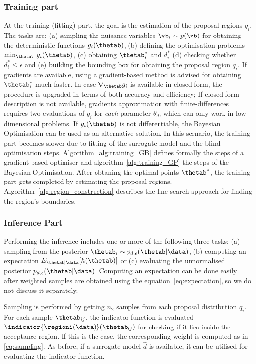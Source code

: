 \subsubsection*{Training part}
\noindent
At the training (fitting) part, the goal is the estimation of the
proposal regions $q_i$. The tasks are; (a) sampling the nuisance
variables $\vb_i \sim p(\vb)$ for obtaining the deterministic
functions $g_i(\thetab)$, (b) defining the optimisation problems
$\min_{\thetab} \: g_i(\thetab)$, (c) obtaining $\thetab_i^*$ and
$d_i^*$ (d) checking whether $d_i^* \leq \epsilon$ and (e) building
the bounding box for obtaining the proposal region $q_i$. If gradients
are available, using a gradient-based method is advised for obtaining
$\thetab_i^*$ much faster. In case $\nabla_{\thetab} g_i$ is available
in closed-form, the procedure is upgraded in terms of both accuracy
and efficiency; If closed-form description is not available, gradients
approximation with finite-differences requires two evaluations of
$g_i$ for \emph{each} parameter $\theta_d$, which can only work in
low-dimensional problems. If $g_i(\thetab)$ is not differentiable, the
Bayesian Optimisation can be used as an alternative solution. In this
scenario, the training part becomes slower due to fitting of the
surrogate model and the blind optimisation
steps. Algorithm~\ref{alg:training_GB} defines formally the steps of a
gradient-based optimiser and algorithm~\ref{alg:training_GP} the steps
of the Bayesian Optimisation. After obtaning the optimal points
$\thetab^*$, the training part gets completed by estimating the
proposal regions. Algorithm~\ref{alg:region_construction} describes
the line search approach for finding the region's boundaries.

\subsubsection*{Inference Part}
Performing the inference includes one or more of the following three
tasks; (a) sampling from the posterior
$ \thetab_i \sim p_{d, \epsilon}(\thetab|\data)$, (b) computing an
expectation $E_{\thetab|\data}[h(\thetab)]$ or (c) evaluating the
unnormalised posterior $p_{d, \epsilon}(\thetab|\data)$. Computing an
expectation can be done easily after weighted samples are obtained
using the equation~\ref{eq:expectation}, so we do not discuss it
separately.

\noindent
Sampling is performed by getting $n_2$ samples from each proposal
distribution $q_i$. For each sample $\thetab_{ij}$, the indicator
function is evaluated $\indicator{\regioni(\data)}(\thetab_{ij})$ for
checking if it lies inside the acceptance region. If this is the case,
the corresponding weight is computed as in \eqref{eq:sampling}. As
before, if a surrogate model $\hat{d}$ is available, it can be
utilised for evaluating the indicator function.

